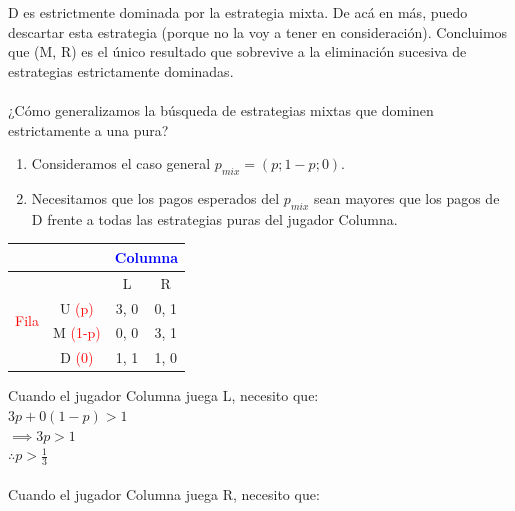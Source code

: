 \documentclass{article}
\begin{document}
                D es estrictmente dominada por la estrategia mixta. De acá en más, puedo descartar esta estrategia (porque no la voy a tener en consideración). Concluimos que (M, R) es el único resultado que sobrevive a la eliminación sucesiva de estrategias estrictamente dominadas. \\
                \\
                ¿Cómo generalizamos la búsqueda de estrategias mixtas que dominen estrictamente a una pura? \\
                \begin{enumerate}
                    \item Consideramos el caso general \(p_{mix} = (p;1-p;0)\).
                    \item Necesitamos que los pagos esperados del $p_{mix}$ sean mayores que los pagos de D frente a todas las estrategias puras del jugador Columna.
                \end{enumerate}
                \begin{table}[H]
                    \centering
                        \begin{tabular}{|c|c|c|c|}
                        \hline
                        & & \multicolumn{2}{|c|}{\textcolor{Blue}{Columna}} \\ \hline
                                                & & L & R \\ \hline
                        \multirow{2}{*}{\textcolor{Red}{Fila}} 
                                                & U \textcolor{red}{(p)}& 3, 0 & 0, 1 \\ \cline{2-4} 
                                                & M \textcolor{red}{(1-p)}& 0, 0 & 3, 1 \\ \cline{2-4}
                                                & D \textcolor{red}{(0)}& 1, 1 & 1, 0 \\ \hline
                        \end{tabular}
                \end{table}
                Cuando el jugador Columna juega L, necesito que: \\
                \(3p + 0(1-p) > 1\) \\
                \(\implies 3p > 1\) \\
                \(\therefore p > \frac{1}{3}\) \\
                \\
                Cuando el jugador Columna juega R, necesito que: \\
\end{document}
